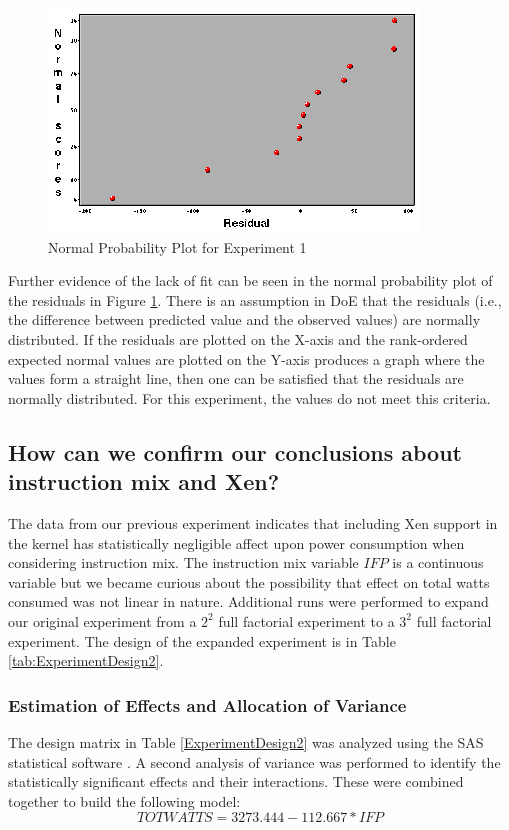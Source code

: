 \documentclass[preprint]{sigplanconf}
\begin{document}
\begin{figure}
  \centering
  \begin{center}
    \includegraphics[scale=1.5]{graphics/normalresiduals1.eps}
  \end{center}
  \caption{Normal Probability Plot for Experiment 1}
  \label{fig:Residuals1}
\end{figure}
Further evidence of the lack of fit can be seen in the normal probability plot of
the residuals in Figure \ref{fig:Residuals1}.  There is an assumption in DoE
\cite{Montgomery2005} that the residuals (i.e., the difference between
predicted value and the observed values) are normally distributed.  If the
residuals are plotted on the X-axis and the rank-ordered expected normal
values are plotted on the Y-axis produces a graph where the values form a
straight line, then one can be satisfied that the residuals are normally
distributed.  For this experiment, the values do not meet this criteria.

\subsection{How can we confirm our conclusions about instruction mix and Xen?}
\label{sec:XenAndInstructionMixFollowUp}
\label{Experiment2}
The data from our previous experiment indicates that including Xen support in
the kernel has statistically negligible affect upon power consumption when
considering instruction mix.  The instruction mix variable $IFP$ is a
continuous variable but we became curious about the possibility that effect on
total watts consumed was not linear in nature. Additional runs were performed
to expand our original experiment from a $2^{2}$ full factorial experiment to
a $3^{2}$ full factorial experiment.   The design of the expanded experiment
is in Table \ref{tab:ExperimentDesign2}.


\subsubsection{Estimation of Effects and Allocation of Variance}
\label{sec:Experiment2Analysis}
The design matrix in Table \ref{ExperimentDesign2} was analyzed using the
SAS statistical software \cite{SAS2006}.   A second analysis of variance was
performed to identify the statistically significant effects and their
interactions.   These were combined together to build the following model:
\begin{equation*}
  \label{eq:ModelExperiment2}
  TOTWATTS = 3273.444 - 112.667*IFP
\end{equation*}
\end{document}
